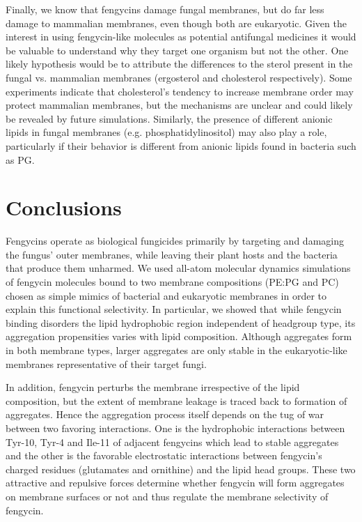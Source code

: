 Finally, we know that fengycins damage fungal membranes, but do far less damage to mammalian membranes, even though both are eukaryotic. Given the interest in using fengycin-like molecules as potential antifungal medicines it would be valuable to understand why they target one organism but not the other.\cite{Rinaldi2009} One likely hypothesis would be to attribute the differences to the sterol present in the fungal vs. mammalian membranes (ergosterol and cholesterol respectively). Some experiments indicate that cholesterol's tendency to increase membrane order may protect mammalian membranes, but the mechanisms are unclear and could likely be revealed by future simulations.\cite{Heerklotz2015}
Similarly, the presence of different anionic lipids in fungal membranes (e.g. phosphatidylinositol) may also play a role, particularly if their behavior is different from anionic lipids found in bacteria such as PG.
\newpage

\section{Conclusions}
\label{s:conclu}

Fengycins operate as biological fungicides primarily by targeting and damaging
the fungus' outer membranes, while leaving their plant hosts and the bacteria
that produce them unharmed.  We used all-atom molecular dynamics simulations of
fengycin molecules bound to two membrane compositions (PE:PG and PC) chosen as
simple mimics of bacterial and eukaryotic membranes in order to explain this
functional selectivity. In particular, we showed that while fengycin binding
disorders the lipid hydrophobic region independent of headgroup type, its
aggregation propensities varies with lipid composition. Although aggregates form
in both membrane types, larger aggregates are only stable in the eukaryotic-like
membranes representative of their target fungi.

In  addition, fengycin perturbs the membrane irrespective of the lipid composition,
but the extent of membrane leakage is traced back to formation of aggregates.
Hence the aggregation process itself depends on the tug of war between two favoring interactions.
One is the hydrophobic interactions between Tyr-10, Tyr-4 and Ile-11 of adjacent fengycins
which lead to stable aggregates and the other is the favorable electrostatic interactions between
fengycin's charged residues (glutamates and ornithine) and the lipid head groups. These two attractive
 and repulsive forces determine whether fengycin will form aggregates on membrane surfaces or not
and thus regulate the membrane selectivity of fengycin.

